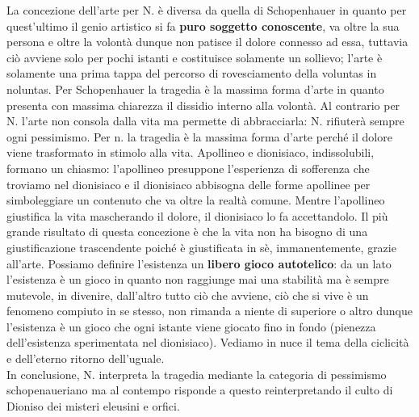 \documentclass[10pt,a4paper]{article}
\begin{document}
La concezione dell'arte per N. è diversa da quella di Schopenhauer in quanto per quest'ultimo il genio artistico si fa \textbf{puro soggetto conoscente}, va oltre la sua persona e oltre la volontà dunque non patisce il dolore connesso ad essa, tuttavia ciò avviene solo per pochi istanti e costituisce solamente un sollievo; l'arte è solamente una prima tappa del percorso di rovesciamento della voluntas in noluntas. Per Schopenhauer la tragedia è la massima forma d'arte in quanto presenta con massima chiarezza il dissidio interno alla volontà. Al contrario per N. l'arte non consola dalla vita ma permette di abbracciarla: N. rifiuterà sempre ogni pessimismo. Per n. la tragedia è la massima forma d'arte perché il dolore viene trasformato in stimolo alla vita. Apollineo e dionisiaco, indissolubili, formano un chiasmo: l'apollineo presuppone l'esperienza di sofferenza che troviamo nel dionisiaco e il dionisiaco abbisogna delle forme apollinee per simboleggiare un contenuto che va oltre la realtà comune. Mentre l'apollineo giustifica la vita mascherando il dolore, il dionisiaco lo fa accettandolo. Il più grande risultato di questa concezione è che la vita non ha bisogno di una giustificazione trascendente poiché è giustificata in sè, immanentemente, grazie all'arte. Possiamo definire l'esistenza un \textbf{libero gioco autotelico}: da un lato l'esistenza è un gioco in quanto non raggiunge mai una stabilità ma è sempre mutevole, in divenire,  dall'altro tutto ciò che avviene, ciò che si vive è un fenomeno compiuto in se stesso, non rimanda a niente di superiore o altro dunque l'esistenza è un gioco che ogni istante viene giocato fino in fondo (pienezza dell'esistenza sperimentata nel dionisiaco). Vediamo in nuce il tema della ciclicità e dell'eterno ritorno dell'uguale. \\
In conclusione, N. interpreta la tragedia mediante la categoria di pessimismo schopenaueriano ma al contempo risponde a questo reinterpretando il culto di Dioniso dei misteri eleusini e orfici. 
\end{document}
